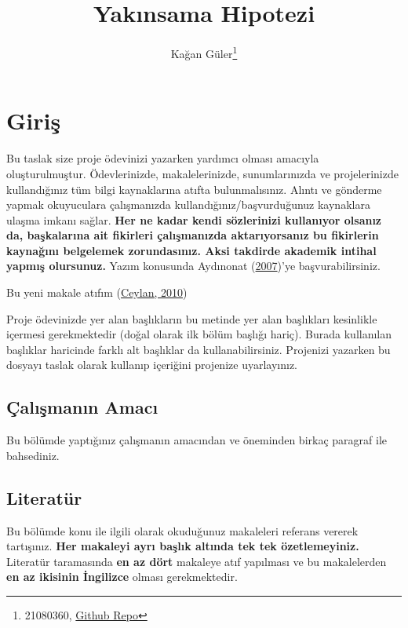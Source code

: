 \documentclass[
  12pt,
]{article}
\title{Yakınsama Hipotezi}
\author{Kağan Güler\footnote{21080360, \href{https://github.com/kaganglr/AraSinav}{Github Repo}}}
\date{}
\begin{document}
\maketitle

\hypertarget{giriux15f}{%
\section{Giriş}\label{giriux15f}}

Bu taslak size proje ödevinizi yazarken yardımcı olması amacıyla oluşturulmuştur. Ödevlerinizde, makalelerinizde, sunumlarınızda ve projelerinizde kullandığınız tüm bilgi kaynaklarına atıfta bulunmalısınız. Alıntı ve gönderme yapmak okuyuculara çalışmanızda kullandığınız/başvurduğunuz kaynaklara ulaşma imkanı sağlar. \textbf{Her ne kadar kendi sözlerinizi kullanıyor olsanız da, başkalarına ait fikirleri çalışmanızda aktarıyorsanız bu fikirlerin kaynağını belgelemek zorundasınız. Aksi takdirde akademik intihal yapmış olursunuz.} Yazım konusunda Aydınonat (\protect\hyperlink{ref-aydinonat:2007}{2007})'ye başvurabilirsiniz.

Bu yeni makale atıfım (\protect\hyperlink{ref-ceylan2010yakinsama}{Ceylan, 2010})

Proje ödevinizde yer alan başlıkların bu metinde yer alan başlıkları kesinlikle içermesi gerekmektedir (doğal olarak ilk bölüm başlığı hariç). Burada kullanılan başlıklar haricinde farklı alt başlıklar da kullanabilirsiniz. Projenizi yazarken bu dosyayı taslak olarak kullanıp içeriğini projenize uyarlayınız.

\hypertarget{uxe7alux131ux15fmanux131n-amacux131}{%
\subsection{Çalışmanın Amacı}\label{uxe7alux131ux15fmanux131n-amacux131}}

Bu bölümde yaptığınız çalışmanın amacından ve öneminden birkaç paragraf ile bahsediniz.

\hypertarget{literatuxfcr}{%
\subsection{Literatür}\label{literatuxfcr}}

Bu bölümde konu ile ilgili olarak okuduğunuz makaleleri referans vererek tartışınız. \textbf{Her makaleyi ayrı başlık altında tek tek özetlemeyiniz.} Literatür taramasında \textbf{en az dört} makaleye atıf yapılması ve bu makalelerden \textbf{en az ikisinin İngilizce} olması gerekmektedir.
\end{document}
